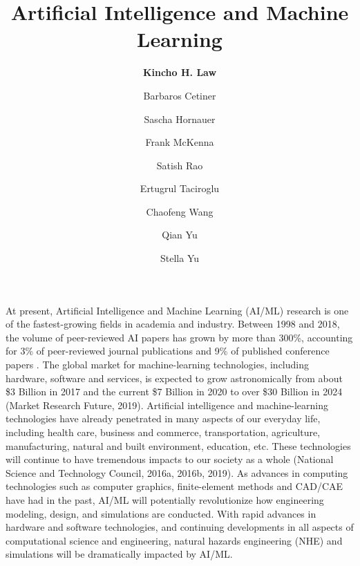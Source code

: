 %
%
%


\title{Artificial Intelligence and Machine Learning}
\author{
    \textbf{Kincho H. Law}
    \and {Barbaros Cetiner}
    \and {Sascha Hornauer}
    \and {Frank McKenna}
    \and {Satish Rao}
    \and {Ertugrul Taciroglu}
    \and {Chaofeng Wang}
    \and {Qian Yu}
    \and {Stella Yu}}
\tocauthor{}
%
%
\maketitle
\label{chapter:cc_aiml}

At present, Artificial Intelligence and Machine Learning (AI/ML) research is one of the fastest-growing fields in academia and industry. Between 1998 and 2018, the volume of peer-reviewed AI papers has grown by more than 300\%, accounting for 3\% of peer-reviewed journal publications and 9\% of published conference papers \citep{perrault2019ai}. The global market for machine-learning technologies, including hardware, software and services, is expected to grow astronomically from about \$3 Billion in 2017 and the current \$7 Billion in 2020 to over \$30 Billion in 2024 (Market Research Future, 2019). Artificial intelligence and machine-learning technologies have already penetrated in many aspects of our everyday life, including health care, business and commerce, transportation, agriculture, manufacturing, natural and built environment, education, etc. These technologies will continue to have tremendous impacts to our society as a whole (National Science and Technology Council, 2016a, 2016b, 2019). As advances in computing technologies such as computer graphics, finite-element methods and CAD/CAE have had in the past, AI/ML will potentially revolutionize how engineering modeling, design, and simulations are conducted. With rapid advances in hardware and software technologies, and continuing developments in all aspects of computational science and engineering, natural hazards engineering (NHE) and simulations will be dramatically impacted by AI/ML.

